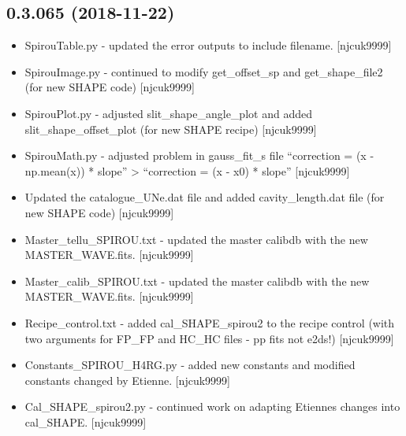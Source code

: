 \documentclass[a4paper,10pt,english]{report}
\begin{document}
\subsection{0.3.065 (2018-11-22)}
\label{\detokenize{misc/changelog:id256}}\begin{itemize}
\item {} 
SpirouTable.py - updated the error outputs to include filename.
{[}njcuk9999{]}

\item {} 
SpirouImage.py - continued to modify get\_offset\_sp and get\_shape\_file2
(for new SHAPE code) {[}njcuk9999{]}

\item {} 
SpirouPlot.py - adjusted slit\_shape\_angle\_plot and added
slit\_shape\_offset\_plot (for new SHAPE recipe) {[}njcuk9999{]}

\item {} 
SpirouMath.py - adjusted problem in gauss\_fit\_s file “correction = (x
- np.mean(x)) * slope” \textendash{}\textgreater{} “correction = (x - x0) * slope” {[}njcuk9999{]}

\item {} 
Updated the catalogue\_UNe.dat file and added cavity\_length.dat file
(for new SHAPE code) {[}njcuk9999{]}

\item {} 
Master\_tellu\_SPIROU.txt - updated the master calibdb with the new
MASTER\_WAVE.fits. {[}njcuk9999{]}

\item {} 
Master\_calib\_SPIROU.txt - updated the master calibdb with the new
MASTER\_WAVE.fits. {[}njcuk9999{]}

\item {} 
Recipe\_control.txt - added cal\_SHAPE\_spirou2 to the recipe control
(with two arguments for FP\_FP and HC\_HC files - pp fits not e2ds!)
{[}njcuk9999{]}

\item {} 
Constants\_SPIROU\_H4RG.py - added new constants and modified constants
changed by Etienne. {[}njcuk9999{]}

\item {} 
Cal\_SHAPE\_spirou2.py - continued work on adapting Etiennes changes
into cal\_SHAPE. {[}njcuk9999{]}

\end{itemize}
\end{document}
